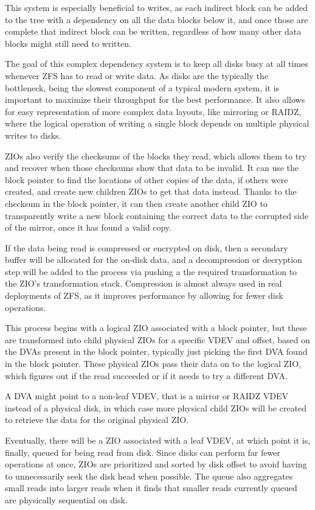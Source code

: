 This system is especially beneficial to writes, as each indirect block can be added to the tree with a dependency on 
all the data blocks below it, and once those are complete
that indirect block can be written, regardless of how many other data blocks might still need to written.

The goal of this complex dependency system is to keep all disks busy at all times whenever ZFS has to read or write data.
As disks are the typically the bottleneck, being the slowest component of a typical modern system,
it is important to maximize their throughput for the best performance.
It also allows for easy representation of more complex data layouts, like mirroring or RAIDZ, 
where the logical operation of writing a single block depends on multiple physical writes to disks.

ZIOs also verify the checksums of the blocks they read, 
which allows them to try and recover when those checksums show that data to be invalid.
It can use the block pointer to find the locations of other copies of the data, if others were created, 
and create new children ZIOs to get that data instead.
Thanks to the checksum in the block pointer, it can then create another child ZIO to transparently write a new block
containing the correct data to the corrupted side of the mirror, once it has found a valid copy.

If the data being read is compressed or encrypted on disk, then a secondary buffer will be allocated for the on-disk data,
and a decompression or decryption step will be added to the process via pushing a the required transformation 
to the ZIO's transformation stack.
Compression is almost always used in real deployments of ZFS, as it improves performance by allowing for fewer disk operations.

This process begins with a logical ZIO associated with a block pointer, but these are transformed into
child physical ZIOs for a specific VDEV and offset, based on the DVAs present in the block pointer,
typically just picking the first DVA found in the block pointer.
These physical ZIOs pass their data on to the logical ZIO, 
which figures out if the read succeeded or if it needs to try a different DVA.

A DVA might point to a non-leaf VDEV, that is a mirror or RAIDZ VDEV instead of a physical disk, 
in which case more physical child ZIOs will be created to retrieve the data for the original physical ZIO.

Eventually, there will be a ZIO associated with a leaf VDEV, at which point it is, finally, queued for being read from disk.
Since disks can perform far fewer operations at once, ZIOs are prioritized and sorted by disk offset to avoid having to 
unnecessarily seek the disk head when possible.
The queue also aggregates small reads into larger reads when it finds that smaller reads currently queued are physically sequential on disk.

